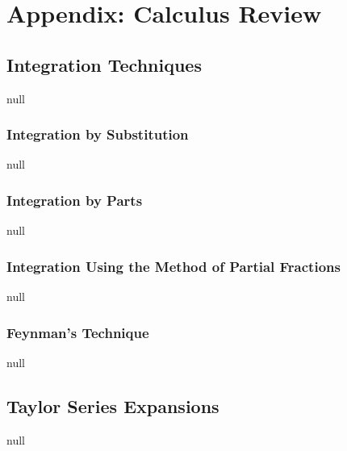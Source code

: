 \chapter{Appendix: Calculus Review}
\section{Integration Techniques}
null
\subsection{Integration by Substitution}
null
\subsection{Integration by Parts}
null
\subsection{Integration Using the Method of Partial Fractions}
null
\subsection{Feynman's Technique}
null
\section{Taylor Series Expansions}
null
